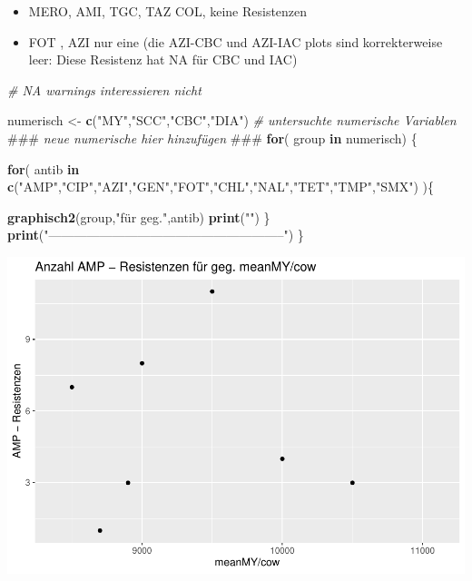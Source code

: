 \documentclass[
]{article}
\newenvironment{Shaded}{\begin{snugshade}}{\end{snugshade}}
\newcommand{\AlertTok}[1]{\textcolor[rgb]{0.94,0.16,0.16}{#1}}
\newcommand{\CommentTok}[1]{\textcolor[rgb]{0.56,0.35,0.01}{\textit{#1}}}
\newcommand{\ControlFlowTok}[1]{\textcolor[rgb]{0.13,0.29,0.53}{\textbf{#1}}}
\newcommand{\KeywordTok}[1]{\textcolor[rgb]{0.13,0.29,0.53}{\textbf{#1}}}
\newcommand{\NormalTok}[1]{#1}
\newcommand{\StringTok}[1]{\textcolor[rgb]{0.31,0.60,0.02}{#1}}
\providecommand{\tightlist}{%
  \setlength{\itemsep}{0pt}\setlength{\parskip}{0pt}}
\begin{document}
\begin{itemize}
\tightlist
\item
  MERO, AMI, TGC, TAZ COL, keine Resistenzen
\item
  FOT , AZI nur eine (die AZI-CBC und AZI-IAC plots sind korrekterweise
  leer: Diese Resistenz hat NA für CBC und IAC)
\end{itemize}

\begin{Shaded}
\begin{Highlighting}[]
\CommentTok{#   NA warnings interessieren nicht}
 
\NormalTok{numerisch <-}\StringTok{ }\KeywordTok{c}\NormalTok{(}\StringTok{"MY"}\NormalTok{,}\StringTok{"SCC"}\NormalTok{,}\StringTok{"CBC"}\NormalTok{,}\StringTok{"DIA"}\NormalTok{)     }\CommentTok{# untersuchte numerische Variablen  }\AlertTok{###}\CommentTok{ neue numerische hier hinzufügen }\AlertTok{###}
\ControlFlowTok{for}\NormalTok{( group }\ControlFlowTok{in}\NormalTok{ numerisch) \{   }

  \ControlFlowTok{for}\NormalTok{( antib }\ControlFlowTok{in} \KeywordTok{c}\NormalTok{(}\StringTok{"AMP"}\NormalTok{,}\StringTok{"CIP"}\NormalTok{,}\StringTok{"AZI"}\NormalTok{,}\StringTok{"GEN"}\NormalTok{,}\StringTok{"FOT"}\NormalTok{,}\StringTok{"CHL"}\NormalTok{,}\StringTok{"NAL"}\NormalTok{,}\StringTok{"TET"}\NormalTok{,}\StringTok{"TMP"}\NormalTok{,}\StringTok{"SMX"}\NormalTok{) )\{ }
  
    \KeywordTok{graphisch2}\NormalTok{(group,}\StringTok{"für geg."}\NormalTok{,antib)  }
    \KeywordTok{print}\NormalTok{(}\StringTok{""}\NormalTok{)}
\NormalTok{  \} }
  \KeywordTok{print}\NormalTok{(}\StringTok{"--------------------------------------------------------"}\NormalTok{)}
\NormalTok{\}}
\end{Highlighting}
\end{Shaded}

\includegraphics{NResistenzen_files/figure-latex/unnamed-chunk-6-1.pdf}
\end{document}
